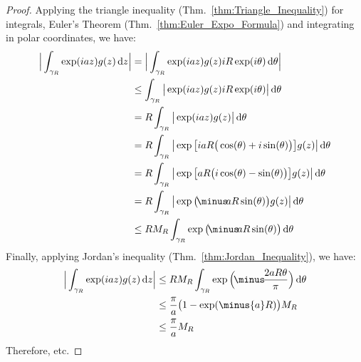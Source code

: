     \begin{proof}
        Applying the triangle inequality
        (Thm.~\ref{thm:Triangle_Inequality}) for integrals,
        Euler's Theorem (Thm.~\ref{thm:Euler_Expo_Formula}) and
        integrating in polar coordinates, we have:
        \begin{subequations}
            \begin{align}
                \Big|\int_{\gamma_{R}}\exp(iaz)g(z)\diff{z}\Big|
                &=\Big|\int_{\gamma_{R}}\exp(iaz)g(z)iR\exp(i\theta)
                    \diff{\theta}\Big|\\
                &\leq\int_{\gamma_{R}}\big|\exp(iaz)g(z)iR\exp(i\theta)
                    \big|\diff{\theta}\\
                &=R\int_{\gamma_{R}}\big|\exp(iaz)g(z)\big|\diff{\theta}\\
                &=R\int_{\gamma_{R}}\big|
                    \exp\big[iaR\big(\cos(\theta)+i\sin(\theta)\big)\big]
                    g(z)\big|\diff{\theta}\\
                &=R\int_{\gamma_{R}}\big|
                    \exp\big[aR\big(i\cos(\theta)-\sin(\theta)\big)\big]
                    g(z)\big|\diff{\theta}\\
                &=R\int_{\gamma_{R}}\big|
                    \exp\big(\!\minus\!aR\sin(\theta)\big)g(z)
                \big|\diff{\theta}\\
                &\leq{R}M_{R}\int_{\gamma_{R}}
                    \exp\big(\!\minus\!aR\sin(\theta)\big)\diff{\theta}
            \end{align}
        \end{subequations}
        Finally, applying Jordan's inequality
        (Thm.~\ref{thm:Jordan_Inequality}), we have:
        \begin{subequations}
            \begin{align}
                \Big|\int_{\gamma_{R}}\exp(iaz)g(z)\diff{z}\Big|
                &\leq{R}M_{R}\int_{\gamma_{R}}
                    \exp\Big(\!\minus\!\frac{2aR\theta}{\pi}\Big)
                \diff{\theta}\\
                &\leq\frac{\pi}{a}\big(1-\exp(\minus{a}R)\big)M_{R}\\
                &\leq\frac{\pi}{a}M_{R}
            \end{align}
        \end{subequations}
        Therefore, etc.
    \end{proof}
    \newpage